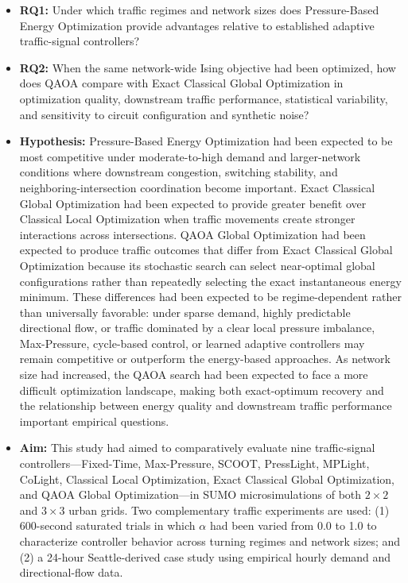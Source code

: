 \begin{itemize}
\item \textbf{RQ1:} Under which traffic regimes and network sizes does
Pressure-Based Energy Optimization provide advantages relative to established
adaptive traffic-signal controllers?

\item \textbf{RQ2:} When the same network-wide Ising objective had been optimized,
how does QAOA compare with Exact Classical Global Optimization in optimization
quality, downstream traffic performance, statistical variability, and
sensitivity to circuit configuration and synthetic noise?

\item \textbf{Hypothesis:} Pressure-Based Energy Optimization had been expected to
be most competitive under moderate-to-high demand and larger-network conditions
where downstream congestion, switching stability, and neighboring-intersection
coordination become important. Exact Classical Global Optimization had been expected
to provide greater benefit over Classical Local Optimization when traffic
movements create stronger interactions across intersections. QAOA Global
Optimization had been expected to produce traffic outcomes that differ from Exact
Classical Global Optimization because its stochastic search can select
near-optimal global configurations rather than repeatedly selecting the exact
instantaneous energy minimum. These differences had been expected to be
regime-dependent rather than universally favorable: under sparse demand,
highly predictable directional flow, or traffic dominated by a clear local
pressure imbalance, Max-Pressure, cycle-based control, or learned adaptive
controllers may remain competitive or outperform the energy-based approaches.
As network size had increased, the QAOA search had been expected to face a more difficult
optimization landscape, making both exact-optimum recovery and the relationship
between energy quality and downstream traffic performance important empirical
questions.

\item \textbf{Aim:} This study had aimed to comparatively evaluate nine
traffic-signal controllers---Fixed-Time, Max-Pressure, SCOOT, PressLight,
MPLight, CoLight, Classical Local Optimization, Exact Classical Global
Optimization, and QAOA Global Optimization---in SUMO microsimulations of both
$2\times2$ and $3\times3$ urban grids. Two complementary traffic experiments
are used: (1) 600-second saturated trials in which $\alpha$ had been varied from
0.0 to 1.0 to characterize controller behavior across turning regimes and
network sizes; and (2) a 24-hour Seattle-derived case study using empirical
hourly demand and directional-flow data.


\end{itemize}
